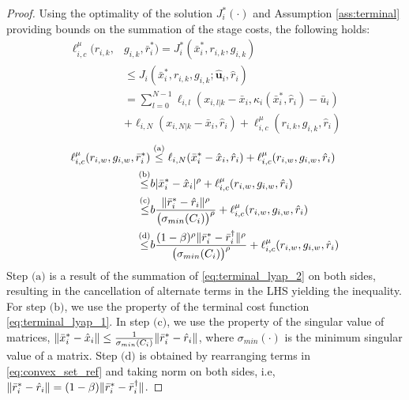 \begin{proof}
Using the optimality of the solution $J_i^*(\cdot)$ and Assumption \ref{ass:terminal} providing bounds on the summation of the stage costs, the following holds:
\begin{align}
\label{eq:stage_cost_bound}
    \ell_{i,c}^\mu(r_{i,k},&g_{i,k},\bar{r}_i^*) = J_i^*(\bar{x}_{i}^*, r_{i,k}, g_{i,k}) \nonumber
    \\&\leq J_i(\bar{x}_{i}^*, r_{i,k}, g_{i,k}; \hat{\mathbf{u}}_i, \hat{r}_i)\nonumber
    \\&=\sum_{l=0}^{N-1} \ell_{i,l}(x_{i,l|k} - \bar{x}_{i}, \kappa_i(\bar{x}_i^*, \hat{r}_i) -  \bar{u}_i) \nonumber
    \\& + \ell_{i,N}(x_{i,N|k} - \bar{x}_i, \hat{r}_i)+ \ell_{i,c}^\mu(r_{i,k},g_{i,k},\hat{r}_i)
\end{align}
\begin{align}
\label{eq:stage_cost_bound_2}
    \ell_{i,c}^\mu(r_{i,w},g_{i,w},\bar{r}_i^*) &\stackrel{\text{(a)}} \leq \ell_{i,N}(\bar{x}^*_{i} - \hat{x}_i, \hat{r}_i) + \ell_{i,c}^\mu(r_{i,w},g_{i,w},\hat{r}_i)\nonumber
    \\\stackrel{\text{(b)}}\leq& b|\bar{x}^*_{i} - \hat{x}_i|^\rho + \ell_{i,c}^\mu(r_{i,w},g_{i,w},\hat{r}_i)\nonumber
    \\\stackrel{\text{(c)}}\leq& b \frac{\lVert\bar{r}_i^* - \hat{r}_i\rVert^\rho}{\bigl(\sigma_{min}(C_i)\bigr)^\rho} + \ell_{i,c}^\mu(r_{i,w},g_{i,w},\hat{r}_i)\nonumber
    \\\stackrel{\text{(d)}}\leq& b \frac{(1-\beta)^\rho\lVert\bar{r}_i^* - \bar{r}_i^\dagger\rVert^\rho}{\bigl(\sigma_{min}(C_i)\bigr)^\rho} + \ell_{i,c}^\mu(r_{i,w},g_{i,w},\hat{r}_i)
\end{align}
Step $\text{(a)}$ is a result of the summation of \eqref{eq:terminal_lyap_2} on both sides, resulting in the cancellation of alternate terms in the LHS yielding the inequality. For step $\text{(b)}$, we use the property of the terminal cost function \eqref{eq:terminal_lyap_1}. In step $\text{(c)}$, we use the property of the singular value of matrices, $\lVert\bar{x}_i^* - \hat{x}_i\rVert \leq \frac{1}{\sigma_{min}(C_i)}\lVert\bar{r}_i^* - \hat{r}_i\rVert$, where $\sigma_{min}(\cdot)$ is the minimum singular value of a matrix. Step $\text{(d)}$ is obtained by rearranging terms in \eqref{eq:convex_set_ref} and taking norm on both sides, i.e,  $\lVert\bar{r}_i^* - \hat{r}_i\rVert = (1-\beta)\lVert\bar{r}_i^* - \bar{r}_i^\dagger\rVert$.


\end{proof}
